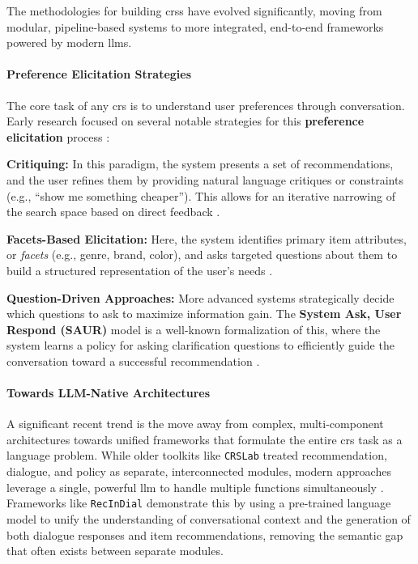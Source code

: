 The methodologies for building \acp{crs} have evolved significantly, moving from modular, pipeline-based systems to more integrated, end-to-end frameworks powered by modern \acp{llm}.

\paragraph{Preference Elicitation Strategies}
The core task of any \ac{crs} is to understand user preferences through conversation. Early research focused on several notable strategies for this \textbf{preference elicitation} process \cite[Section 3]{CHAPTER:RS-HANDBOOK-NLP}:
\begin{compactitem}[\textbullet]
    \item \textbf{Critiquing:} In this paradigm, the system presents a set of recommendations, and the user refines them by providing natural language critiques or constraints (e.g., ``show me something cheaper''). This allows for an iterative narrowing of the search space based on direct feedback \cite[Section 3.2]{CHAPTER:RS-HANDBOOK-NLP}.
    \item \textbf{Facets-Based Elicitation:} Here, the system identifies primary item attributes, or \textit{facets} (e.g., genre, brand, color), and asks targeted questions about them to build a structured representation of the user's needs \cite[Section 3.3]{CHAPTER:RS-HANDBOOK-NLP}.
    \item \textbf{Question-Driven Approaches:} More advanced systems strategically decide which questions to ask to maximize information gain. The \textbf{System Ask, User Respond (SAUR)} model is a well-known formalization of this, where the system learns a policy for asking clarification questions to efficiently guide the conversation toward a successful recommendation \cite[Section 3.4.1]{CHAPTER:RS-HANDBOOK-NLP}.
\end{compactitem}

\paragraph{Towards LLM-Native Architectures}
A significant recent trend is the move away from complex, multi-component architectures towards unified frameworks that formulate the entire \ac{crs} task as a language problem. While older toolkits like \texttt{CRSLab} \cite{CRSLAB} treated recommendation, dialogue, and policy as separate, interconnected modules, modern approaches leverage a single, powerful \ac{llm} to handle multiple functions simultaneously \cite[Section 2.2]{SURVEY-HOLISTIC-RECSYS}. Frameworks like \texttt{RecInDial} \cite{RECINDIAL} demonstrate this by using a pre-trained language model to unify the understanding of conversational context and the generation of both dialogue responses and item recommendations, removing the semantic gap that often exists between separate modules.

